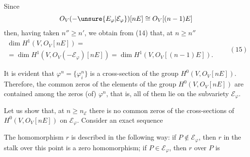 
Since
\[
O_V(-\unsure{E_{\varphi}|\mathcal E_{\varphi}})[nE]\cong O_V[(n-1)E]
\]
then, having taken $n''\geq n'$, we obtain from (14) that, at $n\geq n''$
\[
\begin{gathered}
\dim H^1(V,O_V[nE])=\\[6pt]
=\dim H^1(V,O_V(-\mathcal E_{\varphi})[nE])=\dim H^1(V,O_V[(n-1)E]).
\end{gathered}\qquad(15)
\]

It is evident that $\varphi^n=\{\varphi_i^n\}$ is a cross-section of the group $H^0(V,O_V[nE])$. Therefore, the common zeros of the elements of the group $H^0(V,O_V[nE])$ are contained among the zeros (of) $\varphi^n$, that is, all of them lie on the subvariety $\mathcal E_{\varphi}$.

Let us show that, at $n\geq n_{\mathcal E}$ there is no common zeros of the cross-sections of $H^0(V,O_V[nE])$ on $\mathcal E_{\varphi}$.
Consider an exact sequence

The homomorphism $r$ is described in the following way: if $P\notin\mathcal E_{\varphi}$, then $r$ in the stalk over this point is a zero homomorphism; if $P\in\mathcal E_{\varphi}$, then $r$ over $P$ is


